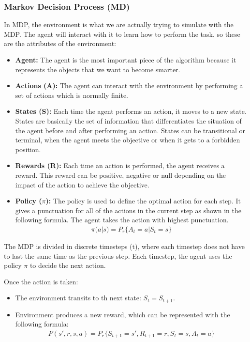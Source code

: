 		\subsubsection{Markov Decision Process (MD)}
			In MDP, the environment is what we are actually trying to simulate with the MDP. The agent will interact with it to learn how to perform the task, so these are the attributes of the environment:
			\begin{itemize}
				\item[\textendash]\textbf{Agent:} The agent is the most important piece of the algorithm because it represents the objects that we want to become smarter.
				\item[\textendash]\textbf{Actions (A):} The agent can interact with the environment by performing a set of actions which is normally finite.
				\item[\textendash]\textbf{States (S): } Each time the agent performs an action, it moves to a new state. States are basically the set of information that differentiates the situation of the agent before and after performing an action. States can be transitional or terminal, when the agent meets the objective or when it gets to a forbidden position.
				\item[\textendash]\textbf{Rewards (R):} Each time an action is performed, the agent receives a reward. This reward can be positive, negative or null depending on the impact of the action to achieve the objective.
				\item[\textendash]\textbf{Policy ($\pi$):} The policy is used to define the optimal action for each step. It gives a punctuation for all of the actions in the current step as shown in the following formula. The agent takes the action with highest punctuation.
				\begin{gather*}
					\pi(a|s)=P_r\{A_t=a|S_t=s\}
				\end{gather*}
			
			\end{itemize}
			
			The MDP is divided in discrete timesteps (t), where each timestep does not have to last the same time as the previous step. Each timestep, the agent uses the policy $\pi$ to decide the next action. 
			
			Once the action is taken:
			\begin{itemize}
				\item[\textendash]The environment transits to th next state: \textbf{ \boldmath$S_t = S_{t+1}$}.
				\item[\textendash] Environment produces a new reward, which can be represented with the following formula: \boldmath
				\begin{gather*}
					P(s', r, s, a) = P_{r}\{S_{t+1}=s', R_{t+1}=r, S_{t}=s, A_{t}=a\}
				\end{gather*}
			\end{itemize}
			
